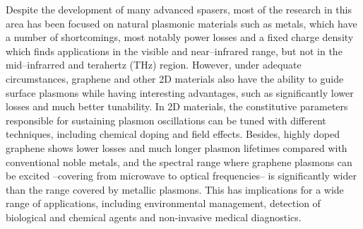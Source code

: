 \documentclass[9pt,twocolumn,twoside]{osajnl}
\begin{document}
Despite the development of many advanced spasers, most of the research in this area 
has been focused on natural plasmonic materials such as metals, which have a number of shortcomings, most notably power losses and a fixed charge density which finds applications in the visible and near–infrared range, but not in the mid–infrarred and terahertz (THz) region. 
However, under adequate circumstances, graphene and other 2D materials also 
have the ability to guide surface plasmons while having interesting advantages, such as significantly lower losses and much better tunability. In 2D materials, the constitutive parameters responsible for sustaining plasmon oscillations can be tuned with different techniques, 
including chemical doping and field effects. Besides, highly doped graphene shows  lower losses and much longer plasmon lifetimes compared with conventional noble metals, and the spectral range where graphene plasmons can be excited --covering from microwave to optical frequencies-- is significantly wider than the range covered by metallic plasmons. This has implications for a wide range of applications, including environmental management, detection of  biological and chemical agents and non-invasive medical diagnostics. 
\end{document}
